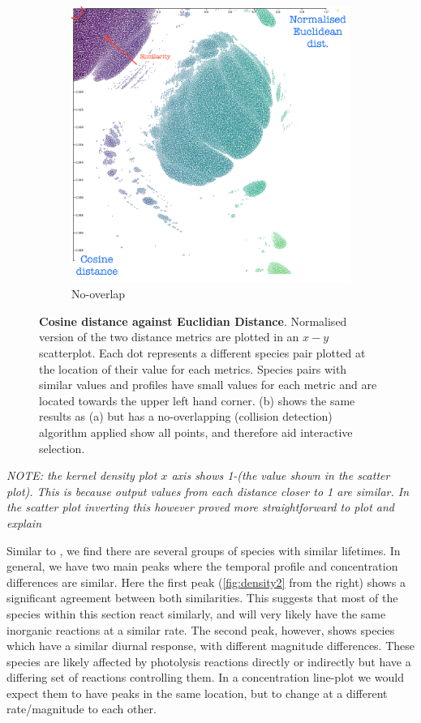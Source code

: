 \begin{figure}[H]
\begin{subfigure}[t]{.5\textwidth}
  \includegraphics[width=\textwidth]{fig/metric.png}
  \caption{No-overlap}
  \label{fig:metric}
  \end{subfigure}
  \caption{\textbf{Cosine distance against Euclidian Distance}. Normalised version of the two distance metrics are plotted in an $x-y$ scatterplot. Each dot represents a different species pair plotted at the location of their value for each metrics. Species pairs with similar values and profiles have small values for each metric and are located towards the upper left hand corner. (b) shows the same results as (a) but has a no-overlapping (collision detection) algorithm applied show all points, and therefore aid interactive selection.}
  \end{figure}


  \textit{NOTE: the kernel density plot $x$ axis shows 1-(the value shown in the scatter plot). This is because output values from each distance closer to 1 are similar. In the scatter plot inverting this however proved more straightforward to plot and explain}


  Similar to \cite{lifetime}, we find there are several groups of species with similar lifetimes. In general, we have two main peaks where the temporal profile and concentration differences are similar. Here the first peak (\autoref{fig:density2} from the right) shows a significant agreement between both similarities. This suggests that most of the species within this section react similarly, and will very likely have the same inorganic reactions at a similar rate. The second peak, however, shows species which have a similar diurnal response, with different magnitude differences. These species are likely affected by photolysis reactions directly or indirectly but have a differing set of reactions controlling them. In a concentration line-plot we would expect them to have peaks in the same location, but to change at a different rate/magnitude to each other.


